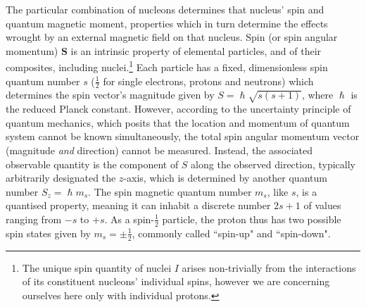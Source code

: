 The particular combination of nucleons determines that nucleus' spin and quantum magnetic moment, properties which in turn determine the effects wrought by an external magnetic field on that nucleus.
Spin (or spin angular momentum) $\mathbf{S}$ is an intrinsic property of elemental particles, and of their composites, including nuclei.\autocite{Eisberg1961}\footnote[2]{The unique spin quantity of nuclei $I$ arises non-trivially from the interactions of its constituent nucleons' individual spins, however we are concerning ourselves here only with individual protons.}
Each particle has a fixed, dimensionless spin quantum number $s$ ($\frac{1}{2}$ for single electrons, protons and neutrons) which determines the spin vector's magnitude given by $S = \hslash \sqrt{s(s+1)}$, where $\hslash$ is the reduced Planck constant.
However, according to the uncertainty principle of quantum mechanics, which posits that the location and momentum of quantum system cannot be known simultaneously, the total spin angular momentum vector (magnitude \textit{and} direction) cannot be measured.
Instead, the associated observable quantity is the component of $S$ along the observed direction, typically arbitrarily designated the $z$-axis, which is determined by another quantum number $S_z = \hslash m_s$.
The spin magnetic quantum number $m_s$, like $s$, is a quantised property, meaning it can inhabit a discrete number $2s+1$ of values ranging from $-s$ to $+s$.
As a spin-$\frac{1}{2}$ particle, the proton thus has two possible spin states given by $m_s = \pm \frac{1}{2}$, commonly called ``spin-up" and ``spin-down".


